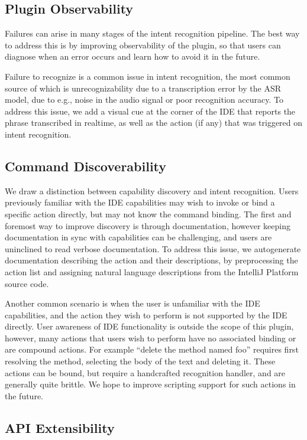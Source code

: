 \documentclass[conference]{IEEEtran}
\begin{document}
\subsection{Plugin Observability}

Failures can arise in many stages of the intent recognition pipeline. The best way to address this is by improving observability of the plugin, so that users can diagnose when an error occurs and learn how to avoid it in the future.

Failure to recognize is a common issue in intent recognition, the most common source of which is unrecognizability due to a transcription error by the ASR model, due to e.g., noise in the audio signal or poor recognition accuracy. To address this issue, we add a visual cue at the corner of the IDE that reports the phrase transcribed in realtime, as well as the action (if any) that was triggered on intent recognition.

\subsection{Command Discoverability}

We draw a distinction between capability discovery and intent recognition. Users previously familiar with the IDE capabilities may wish to invoke or bind a specific action directly, but may not know the command binding. The first and foremost way to improve discovery is through documentation, however keeping documentation in sync with capabilities can be challenging, and users are uninclined to read verbose documentation. To address this issue, we autogenerate documentation describing the action and their descriptions, by preprocessing the action list and assigning natural language descriptions from the IntelliJ Platform source code.

Another common scenario is when the user is unfamiliar with the IDE capabilities, and the action they wish to perform is not supported by the IDE directly. User awareness of IDE functionality is outside the scope of this plugin, however, many actions that users wish to perform have no associated binding or are compound actions. For example ``delete the method named \textlangle foo\textrangle'' requires first resolving the method, selecting the body of the text and deleting it. These actions can be bound, but require a handcrafted recognition handler, and are generally quite brittle. We hope to improve scripting support for such actions in the future.

\subsection{API Extensibility}
\end{document}
